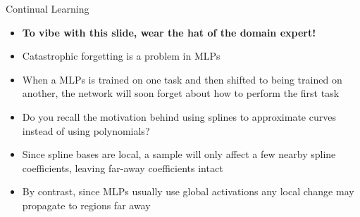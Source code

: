 \begin{frame}{Continual Learning}
   \begin{itemize}
   		\item \textbf{To vibe with this slide, wear the hat of the domain expert!} \vspace{0.3em}
       \item Catastrophic forgetting is a problem in MLPs \vspace{0.3em}
       \item When a MLPs is trained on one task and then  shifted to being trained on another, the network will soon forget about how to perform the first task \vspace{0.3em}
       \item Do you recall the motivation behind using splines to approximate curves instead of using polynomials?  \vspace{0.3em}
       \item Since spline bases are local, a sample will only affect a few nearby spline coefficients, leaving far-away coefficients intact \vspace{0.3em}
       \item By contrast, since MLPs usually use global activations any local change may propagate to regions far away \vspace{0.3em}
   \end{itemize}
\end{frame}


